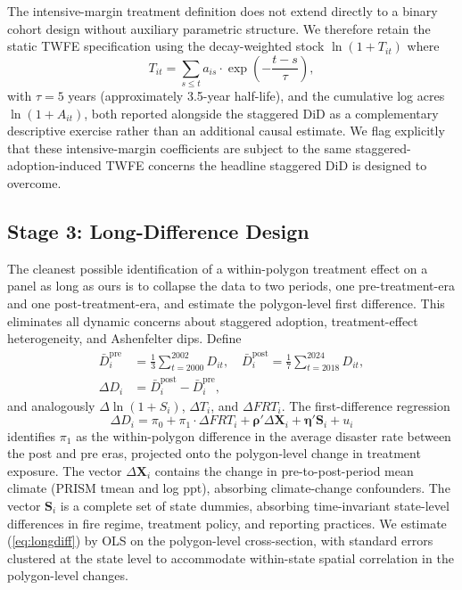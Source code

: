 \documentclass[12pt, letterpaper]{article}
\begin{document}
The intensive-margin treatment definition does not extend directly to a binary cohort design without auxiliary parametric structure. We therefore retain the static TWFE specification using the decay-weighted stock $\ln(1 + T_{it})$ where
\begin{equation}
T_{it} = \sum_{s \leq t} a_{is} \cdot \exp\!\left(-\frac{t - s}{\tau}\right),
\label{eq:tstock}
\end{equation}
with $\tau = 5$ years (approximately 3.5-year half-life), and the cumulative log acres $\ln(1 + A_{it})$, both reported alongside the staggered DiD as a complementary descriptive exercise rather than an additional causal estimate. We flag explicitly that these intensive-margin coefficients are subject to the same staggered-adoption-induced TWFE concerns the headline staggered DiD is designed to overcome.

\subsection{Stage 3: Long-Difference Design}\label{sec:long_diff}

The cleanest possible identification of a within-polygon treatment effect on a panel as long as ours is to collapse the data to two periods, one pre-treatment-era and one post-treatment-era, and estimate the polygon-level first difference. This eliminates all dynamic concerns about staggered adoption, treatment-effect heterogeneity, and Ashenfelter dips. Define
\begin{align}
\bar{D}_i^{\text{pre}} &= \frac{1}{3} \sum_{t = 2000}^{2002} D_{it}, \quad \bar{D}_i^{\text{post}} = \frac{1}{7} \sum_{t = 2018}^{2024} D_{it}, \\
\Delta D_i &= \bar{D}_i^{\text{post}} - \bar{D}_i^{\text{pre}},
\end{align}
and analogously $\Delta \ln(1 + S_i)$, $\Delta T_i$, and $\Delta FRT_i$. The first-difference regression
\begin{equation}
\Delta D_i = \pi_0 + \pi_1 \cdot \Delta FRT_i + \boldsymbol{\rho}' \Delta \mathbf{X}_i + \boldsymbol{\eta}' \mathbf{S}_i + u_i
\label{eq:longdiff}
\end{equation}
identifies $\pi_1$ as the within-polygon difference in the average disaster rate between the post and pre eras, projected onto the polygon-level change in treatment exposure. The vector $\Delta \mathbf{X}_i$ contains the change in pre-to-post-period mean climate (PRISM tmean and log ppt), absorbing climate-change confounders. The vector $\mathbf{S}_i$ is a complete set of state dummies, absorbing time-invariant state-level differences in fire regime, treatment policy, and reporting practices. We estimate (\ref{eq:longdiff}) by OLS on the polygon-level cross-section, with standard errors clustered at the state level to accommodate within-state spatial correlation in the polygon-level changes.
\end{document}
